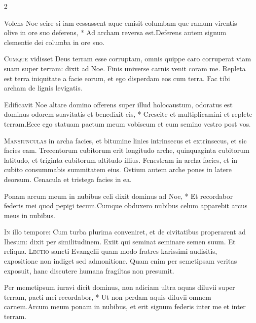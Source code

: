 \begin{multicols*}{2}
\begin{responsory}
{Volens Noe scire si iam cessassent aque emisit columbam que ramum virentis olive in ore suo deferens, * Ad archam reversa est.}{Deferens autem signum clementie dei columba in ore suo.}
\end{responsory}%
\lettrine[lines=2]{\zallmancaps \color{Blue} C}{umque} vidisset Deus terram esse corruptam, omnis quippe caro corruperat viam suam super terram: dixit ad Noe. Finis universe carnis venit coram me. Repleta est terra iniquitate a facie eorum, et ego disperdam eos cum terra. Fac tibi archam de lignis levigatis.
\begin{responsory}
{Edificavit Noe altare domino offerens super illud holocaustum, odoratus est dominus odorem suavitatis et benedixit eis, * Crescite et multiplicamini et replete terram.}{Ecce ego statuam pactum meum vobiscum et cum semino vestro post vos.}
\end{responsory}%
\lettrine[lines=2]{\zallmancaps \color{Red} M}{ansiunculas} in archa facies, et bitumine linies intrinsecus et extrinsecus, et sic facies eam. Trecentorum cubitorum erit longitudo arche, quinquaginta cubitorum latitudo, et triginta cubitorum altitudo illius. Fenestram in archa facies, et in cubito consummabis summitatem eius. Ostium autem arche pones in latere deorsum. Cenacula et tristega facies in ea.
\begin{responsory-doxology}
{Ponam arcum meum in nubibus celi dixit dominus ad Noe, * Et recordabor federis mei quod pepigi tecum.}{Cumque obduxero nubibus celum apparebit arcus meus in nubibus.}
\end{responsory-doxology}%
\lettrine[lines=2]{\zallmancaps \color{Blue} I}{n} illo tempore: Cum turba plurima conveniret, et de civitatibus properarent ad Ihesum: dixit per similitudinem. Exiit qui seminat seminare semen suum. Et reliqua.
\lettrine[lines=2]{\zallmancaps \color{Red} L}{ectio} sancti Evangelii quam modo fratres karissimi audisitis, expositione non indiget sed admonitione. Quam enim per semetipsam veritas exposuit, hanc discutere humana fragiltas non presumit.
\begin{responsory}
{Per memetipsum iuravi dicit dominus, non adiciam ultra aquas diluvii super terram, pacti mei recordabor, * Ut non perdam aquis diluvii omnem carnem.}{Arcum meum ponam in nubibus, et erit signum federis inter me et inter terram.}

\end{responsory}
\end{multicols*}
